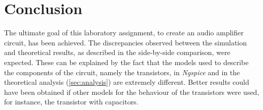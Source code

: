 %             
%             







\section{Conclusion}
\label{sec:conclusion}


The ultimate goal of this laboratory assignment, to create an audio amplifier
circuit, has been achieved.
The discrepancies observed between the simulation and theoretical results,
as described in the side-by-side comparison, were expected.
These can be explained by the fact that the models used to describe the
components of the circuit, namely the transistors, in \textit{Ngspice}
and in the theoretical analysis (\ref{sec:analysis}) are extremely
different. Better results could have been obtained if other models
for the behaviour of the transistors were used, for instance, the
transistor with capacitors.


